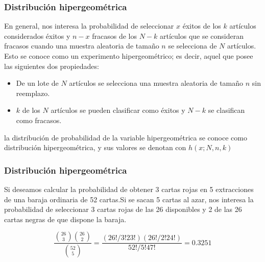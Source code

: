 \documentclass[spanish]{beamer}
\begin{document}
\begin{frame}
\frametitle{Distribución hipergeométrica}  
En general, nos interesa la probabilidad de seleccionar $x$ éxitos de los $k$ artículos considerados éxitos y $n-x$ fracasos de los $N-k$ artículos que se consideran fracasos cuando una muestra aleatoria de tamaño $n$ se selecciona de $N$ artículos. Esto se conoce como un experimento hipergeométrico; es decir, aquel que posee las siguientes dos propiedades:
\begin{itemize}
\item De un lote de $N$ artículos se selecciona una muestra aleatoria de tamaño $n$ sin reemplazo.
\item $k$ de los $N$ artículos se pueden clasificar como éxitos y $N-k$ se clasifican como fracasos.
\end{itemize}
la distribución de probabilidad de la variable hipergeométrica se conoce como distribución hipergeométrica, y sus valores se denotan con $h(x; N, n, k)$
\end{frame}

\begin{frame}
\frametitle{Distribución hipergeométrica}  
Si deseamos calcular la probabilidad de obtener 3 cartas rojas en 5 extracciones de
una baraja ordinaria de 52 cartas.Si se sacan 5 cartas al azar, nos interesa la probabilidad de seleccionar 3 cartas rojas de las 26 disponibles y 2 de las 26 cartas negras de que dispone la baraja.

\begin{equation*}
\frac{\binom{26}{3}\binom{26}{2}}{\binom{52}{5}}= \frac{(26!/3!23!)(26!/2!24!)}{52!/5!47!}=0.3251
\end{equation*}
\end{frame}
\end{document}
